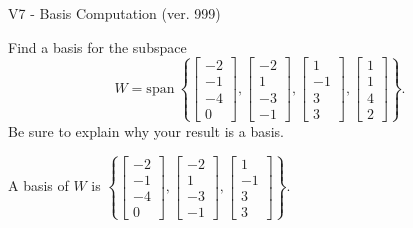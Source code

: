 \begin{exercise}
  \begin{exerciseTitle}V7 - Basis Computation (ver. 999)\end{exerciseTitle}
  \begin{exerciseStatement}
    Find a basis for the subspace 
\[W=\mathrm{span}\ \left\{\left[\begin{array}{r}
-2 \\
-1 \\
-4 \\
0
\end{array}\right] , \left[\begin{array}{r}
-2 \\
1 \\
-3 \\
-1
\end{array}\right] , \left[\begin{array}{r}
1 \\
-1 \\
3 \\
3
\end{array}\right] , \left[\begin{array}{r}
1 \\
1 \\
4 \\
2
\end{array}\right]\right\}.\]
 Be sure to explain why your result is a basis.


  \end{exerciseStatement}
  \begin{exerciseAnswer}
   A basis of \(W\) is  \(\left\{\left[\begin{array}{r}
-2 \\
-1 \\
-4 \\
0
\end{array}\right] , \left[\begin{array}{r}
-2 \\
1 \\
-3 \\
-1
\end{array}\right] , \left[\begin{array}{r}
1 \\
-1 \\
3 \\
3
\end{array}\right]\right\}\).
  


  \end{exerciseAnswer}
\end{exercise}